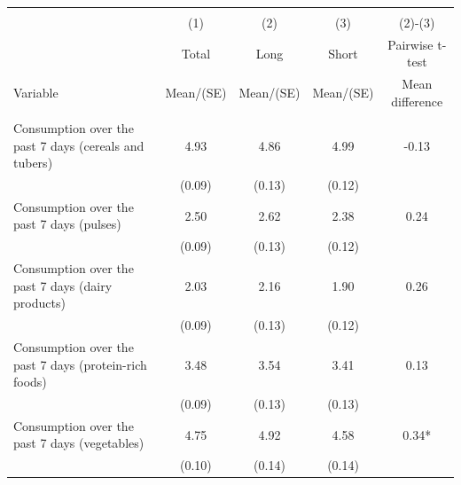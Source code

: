 
\begin{tabular}{@{\extracolsep{5pt}}lcccc}
\\[-1.8ex]\hline \hline \\[-1.8ex]
 & \multicolumn{1}{c}{(1)}  & \multicolumn{1}{c}{(2)}  & \multicolumn{1}{c}{(3)}  & \multicolumn{1}{c}{(2)-(3)} \\
 & \multicolumn{1}{c}{Total}  & \multicolumn{1}{c}{Long}  & \multicolumn{1}{c}{Short}  & \multicolumn{1}{c}{Pairwise t-test}  \\
Variable & Mean/(SE) & Mean/(SE) & Mean/(SE) & Mean difference \\ \hline \\[-1.8ex] 
Consumption over the past 7 days (cereals and tubers)   & 4.93    & 4.86    & 4.99    & -0.13   \\
 & (0.09)  & (0.13)  & (0.12)  &  \\ [1ex]
Consumption over the past 7 days (pulses)   & 2.50    & 2.62    & 2.38    & 0.24   \\
 & (0.09)  & (0.13)  & (0.12)  &  \\ [1ex]
Consumption over the past 7 days (dairy products)   & 2.03    & 2.16    & 1.90    & 0.26   \\
 & (0.09)  & (0.13)  & (0.12)  &  \\ [1ex]
Consumption over the past 7 days (protein-rich foods)   & 3.48    & 3.54    & 3.41    & 0.13   \\
 & (0.09)  & (0.13)  & (0.13)  &  \\ [1ex]
Consumption over the past 7 days (vegetables)   & 4.75    & 4.92    & 4.58    & 0.34*   \\
 & (0.10)  & (0.14)  & (0.14)  &  \\ [1ex]

\end{tabular}
